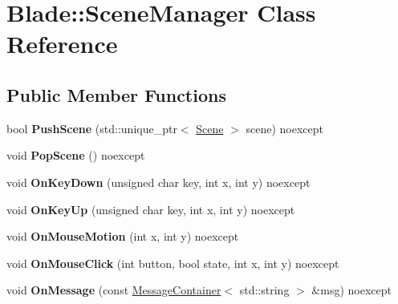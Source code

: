 \hypertarget{class_blade_1_1_scene_manager}{}\section{Blade\+:\+:Scene\+Manager Class Reference}
\label{class_blade_1_1_scene_manager}
\subsection*{Public Member Functions}
\begin{DoxyCompactItemize}
\item 
\mbox{\label{class_blade_1_1_scene_manager_a3bdd62a565c3b39bb0ae0399f16b36d5}} 
bool {\bfseries Push\+Scene} (std\+::unique\+\_\+ptr$<$ \hyperlink{class_blade_1_1_scene}{Scene} $>$ scene) noexcept
\item 
\mbox{\label{class_blade_1_1_scene_manager_af71cf80bd23a9b708abccd58c110c183}} 
void {\bfseries Pop\+Scene} () noexcept
\item 
\mbox{\label{class_blade_1_1_scene_manager_a58a554c9fbce22aa0e09b51d4811f9fe}} 
void {\bfseries On\+Key\+Down} (unsigned char key, int x, int y) noexcept
\item 
\mbox{\label{class_blade_1_1_scene_manager_ad2841ecb96bdfc11134e365ae2f8eb51}} 
void {\bfseries On\+Key\+Up} (unsigned char key, int x, int y) noexcept
\item 
\mbox{\label{class_blade_1_1_scene_manager_a38dfdd6584e00fbf5b5181cc772b8050}} 
void {\bfseries On\+Mouse\+Motion} (int x, int y) noexcept
\item 
\mbox{\label{class_blade_1_1_scene_manager_a2dc0c80a65f765e2ef4ac4ca69b9231e}} 
void {\bfseries On\+Mouse\+Click} (int button, bool state, int x, int y) noexcept
\item 
\mbox{\label{class_blade_1_1_scene_manager_ae0bc94af4c9686236c90d2a9a6529062}} 
void {\bfseries On\+Message} (const \hyperlink{class_blade_1_1_ref_counted_container}{Message\+Container}$<$ std\+::string $>$ \&msg) noexcept

\end{DoxyCompactItemize}
